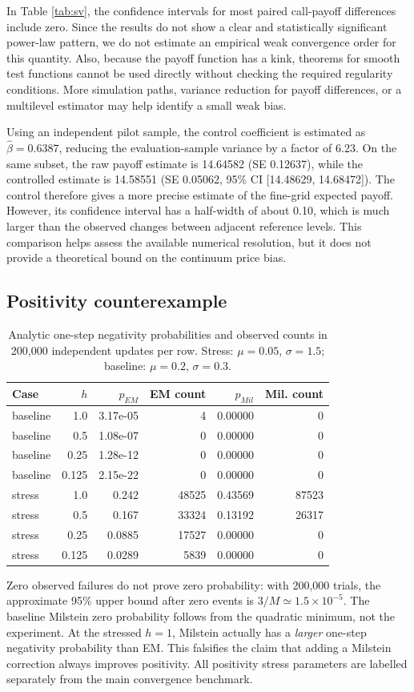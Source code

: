 In Table \ref{tab:sv}, the confidence intervals for most paired call-payoff differences include zero. Since the results do not show a clear and statistically significant power-law pattern, we do not estimate an empirical weak convergence order for this quantity. Also, because the payoff function has a kink, theorems for smooth test functions cannot be used directly without checking the required regularity conditions. More simulation paths, variance reduction for payoff differences, or a multilevel estimator may help identify a small weak bias.

Using an independent pilot sample, the control coefficient is estimated as $\hat{\beta}=0.6387$, reducing the evaluation-sample variance by a factor of 6.23. On the same subset, the raw payoff estimate is 14.64582 (SE 0.12637), while the controlled estimate is 14.58551 (SE 0.05062, 95\% CI [14.48629, 14.68472]). The control therefore gives a more precise estimate of the fine-grid expected payoff. However, its confidence interval has a half-width of about 0.10, which is much larger than the observed changes between adjacent reference levels. This comparison helps assess the available numerical resolution, but it does not provide a theoretical bound on the continuum price bias.

\subsection{Positivity counterexample}
\begin{table}[H]\centering\small
\caption{Analytic one-step negativity probabilities and observed counts in 200,000 independent updates per row. Stress: $\mu=0.05$, $\sigma=1.5$; baseline: $\mu=0.2$, $\sigma=0.3$.}\label{tab:positive}
\begin{tabular}{lrrrrr}\toprule
Case & $h$ & $p_{EM}$ & EM count & $p_{Mil}$ & Mil. count\\\midrule
baseline & 1.0 & 3.17e-05 & 4 & 0.00000 & 0\\
baseline & 0.5 & 1.08e-07 & 0 & 0.00000 & 0\\
baseline & 0.25 & 1.28e-12 & 0 & 0.00000 & 0\\
baseline & 0.125 & 2.15e-22 & 0 & 0.00000 & 0\\
stress & 1.0 & 0.242 & 48525 & 0.43569 & 87523\\
stress & 0.5 & 0.167 & 33324 & 0.13192 & 26317\\
stress & 0.25 & 0.0885 & 17527 & 0.00000 & 0\\
stress & 0.125 & 0.0289 & 5839 & 0.00000 & 0\\
\bottomrule\end{tabular}\end{table}
Zero observed failures do not prove zero probability: with 200,000 trials, the approximate 95\% upper bound after zero events is $3/M\simeq1.5\times10^{-5}$. The baseline Milstein zero probability follows from the quadratic minimum, not the experiment. At the stressed $h=1$, Milstein actually has a \emph{larger} one-step negativity probability than EM. This falsifies the claim that adding a Milstein correction always improves positivity. All positivity stress parameters are labelled separately from the main convergence benchmark.

